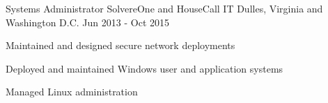 \begin{cventries}
    \cventry
    {Systems Administrator} %
    {SolvereOne and HouseCall IT} %
    {Dulles, Virginia and Washington D.C.} %
    {Jun 2013 - Oct 2015} %
    {
        \begin{cvitems} %
        \item {Maintained and designed secure network deployments}
        \item {Deployed and maintained Windows user and application systems}
        \item {Managed Linux administration}
        \end{cvitems}
    }

\end{cventries}
